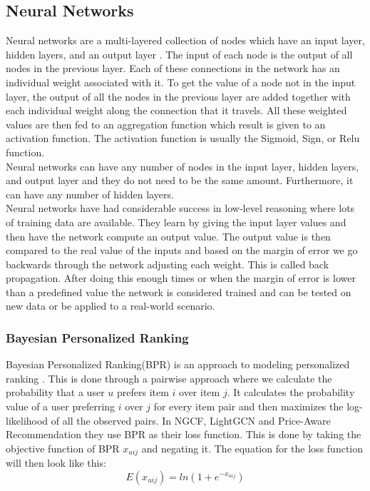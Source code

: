 \subsection{Neural Networks}
Neural networks are a multi-layered collection of nodes which have an input layer, hidden layers, and an output layer \cite{AI-book}.
The input of each node is the output of all nodes in the previous layer.
Each of these connections in the network has an individual weight associated with it.
To get the value of a node not in the input layer, the output of all the nodes in the previous layer are added together with each individual weight along the connection that it travels.
All these weighted values are then fed to an aggregation function which result is given to an activation function.
The activation function is usually the Sigmoid, Sign, or Relu function.
\\
Neural networks can have any number of nodes in the input layer, hidden layers, and output layer and they do not need to be the same amount.
Furthermore, it can have any number of hidden layers.
\\
Neural networks have had considerable success in low-level reasoning where lots of training data are available.
They learn by giving the input layer values and then have the network compute an output value.
The output value is then compared to the real value of the inputs and based on the margin of error we go backwards through the network adjusting each weight.
This is called back propagation.
After doing this enough times or when the margin of error is lower than a predefined value the network is considered trained and can be tested on new data or be applied to a real-world scenario.

\subsubsection{Bayesian Personalized Ranking}\label{subsubsec:BPR}
Bayesian Personalized Ranking(BPR) is an approach to modeling personalized ranking \cite{BPR}.
This is done through a pairwise approach where we calculate the probability that a user $u$ prefers item $i$ over item $j$.
It calculates the probability value of a user preferring $i$ over $j$ for every item pair and then maximizes the log-likelihood of all the observed pairs.
In NGCF, LightGCN and Price-Aware Recommendation they use BPR as their loss function.
This is done by taking the objective function of BPR $x_{uij}$ and negating it.
The equation for the loss function will then look like this:
\[E(x_{uij}) = ln(1+e^{-x_{uij}})\]

